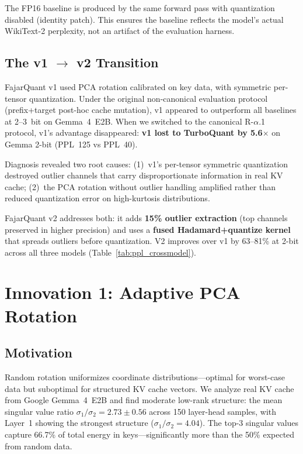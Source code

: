 \documentclass{article}
\begin{document}
The FP16 baseline is produced by the same forward pass with
quantization disabled (identity patch). This ensures the baseline
reflects the model's actual WikiText-2 perplexity, not an artifact
of the evaluation harness.

\subsection{The v1 $\to$ v2 Transition}
\label{sec:v1v2}

FajarQuant v1 used PCA rotation calibrated on key data, with symmetric
per-tensor quantization. Under the original non-canonical evaluation
protocol (prefix+target post-hoc cache mutation), v1 appeared to
outperform all baselines at 2--3~bit on Gemma~4~E2B. When we switched
to the canonical R-$\alpha$.1 protocol, v1's advantage disappeared:
\textbf{v1 lost to TurboQuant by 5.6$\times$} on Gemma 2-bit
(PPL~125 vs PPL~40).

Diagnosis revealed two root causes: (1)~v1's per-tensor symmetric
quantization destroyed outlier channels that carry disproportionate
information in real KV cache; (2)~the PCA rotation without outlier
handling amplified rather than reduced quantization error on high-kurtosis
distributions.

FajarQuant v2 addresses both: it adds \textbf{15\% outlier extraction}
(top channels preserved in higher precision) and uses a \textbf{fused
Hadamard+quantize kernel} that spreads outliers before quantization.
V2 improves over v1 by 63--81\% at 2-bit across all three models
(Table~\ref{tab:ppl_crossmodel}).

\section{Innovation 1: Adaptive PCA Rotation}

\subsection{Motivation}

Random rotation uniformizes coordinate distributions---optimal for worst-case data but suboptimal for structured KV cache vectors. We analyze real KV cache from Google Gemma~4~E2B and find moderate low-rank structure: the mean singular value ratio $\sigma_1/\sigma_2 = 2.73 \pm 0.56$ across 150 layer-head samples, with Layer~1 showing the strongest structure ($\sigma_1/\sigma_2 = 4.04$). The top-3 singular values capture 66.7\% of total energy in keys---significantly more than the 50\% expected from random data.
\end{document}
